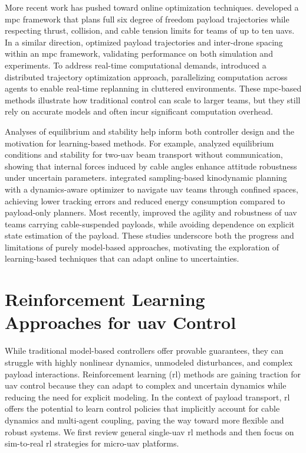 More recent work has pushed toward online optimization techniques. \cite{sun_nonlinear_2023} developed a \gls{mpc} framework that plans full six degree of freedom payload trajectories while respecting thrust, collision, and cable tension limits for teams of up to ten \glspl{uav}. In a similar direction, \cite{li_nonlinear_2023} optimized payload trajectories and inter-drone spacing within an \gls{mpc} framework, validating performance on both simulation and experiments. To address real-time computational demands, \cite{jackson_scalable_2020} introduced a distributed trajectory optimization approach, parallelizing computation across agents to enable real-time replanning in cluttered environments. These \gls{mpc}-based methods illustrate how traditional control can scale to larger teams, but they still rely on accurate models and often incur significant computation overhead.

Analyses of equilibrium and stability help inform both controller design and the motivation for learning-based methods. For example, \cite{gabellieri_equilibria_2023} analyzed equilibrium conditions and stability for two-\gls{uav} beam transport without communication, showing that internal forces induced by cable angles enhance attitude robustness under uncertain parameters. \cite{wahba_kinodynamic_2024} integrated sampling-based kinodynamic planning with a dynamics-aware optimizer to navigate \gls{uav} teams through confined spaces, achieving lower tracking errors and reduced energy consumption compared to payload-only planners. Most recently, \cite{Wang2025SafeAA} improved the agility and robustness of \gls{uav} teams carrying cable-suspended payloads, while avoiding dependence on explicit state estimation of the payload. These studies underscore both the progress and limitations of purely model-based approaches, motivating the exploration of learning-based techniques that can adapt online to uncertainties.

\section{Reinforcement Learning Approaches for \gls{uav} Control}
While traditional model-based controllers offer provable guarantees, they can struggle with highly nonlinear dynamics, unmodeled disturbances, and complex payload interactions. Reinforcement learning (\gls{rl}) methods are gaining traction for \gls{uav} control because they can adapt to complex and uncertain dynamics while reducing the need for explicit modeling. In the context of payload transport, \gls{rl} offers the potential to learn control policies that implicitly account for cable dynamics and multi-agent coupling, paving the way toward more flexible and robust systems. We first review general single-\gls{uav} \gls{rl} methods and then focus on sim-to-real \gls{rl} strategies for micro-\gls{uav} platforms.

